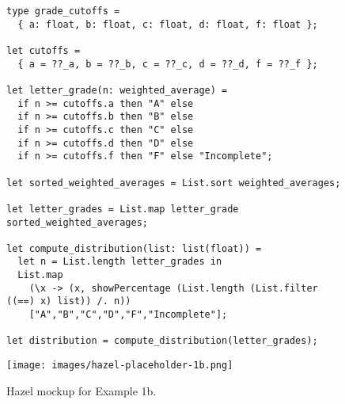 \begin{figure}[t]


\lstset{basicstyle=\scriptsize\ttfamily}
\begin{lstlisting}
type grade_cutoffs =
  { a: float, b: float, c: float, d: float, f: float };

let cutoffs =
  { a = ??_a, b = ??_b, c = ??_c, d = ??_d, f = ??_f };

let letter_grade(n: weighted_average) =
  if n >= cutoffs.a then "A" else
  if n >= cutoffs.b then "B" else
  if n >= cutoffs.c then "C" else
  if n >= cutoffs.d then "D" else
  if n >= cutoffs.f then "F" else "Incomplete";

let sorted_weighted_averages = List.sort weighted_averages;

let letter_grades = List.map letter_grade sorted_weighted_averages;

let compute_distribution(list: list(float)) =
  let n = List.length letter_grades in
  List.map
    (\x -> (x, showPercentage (List.length (List.filter ((==) x) list)) /. n))
    ["A","B","C","D","F","Incomplete"];

let distribution = compute_distribution(letter_grades);
\end{lstlisting}
\lstset{basicstyle=\footnotesize\ttfamily}

\texttt{[image: images/hazel-placeholder-1b.png]}

\caption{Hazel mockup for Example 1b.}
\label{fig:grades-example-b}
\end{figure}
